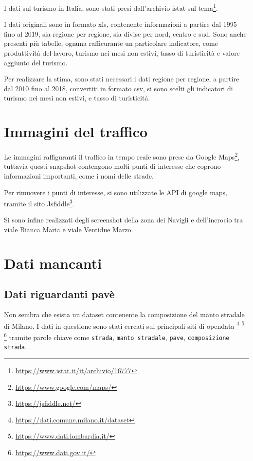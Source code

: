 \documentclass[a4paper]{report}
\newcommand{\columnstyle}[1]{\texttt{#1}}
\begin{document}
I dati sul turismo in Italia, sono stati presi dall'archivio istat sul 
tema\footnote{\url{https://www.istat.it/it/archivio/16777}}.

I dati originali sono in formato xls, contenente informazioni a partire dal 1995 fino al 2019, 
sia regione per regione, sia divise per nord, centro e sud.
Sono anche presenti più tabelle, ognuna rafficurante un particolare indicatore, 
come produttività del lavoro, turismo nei mesi non estivi, tasso di turisticità 
e valore aggiunto del turismo.

Per realizzare la stima, sono stati necessari i dati regione per regione, 
a partire dal 2010 fino al 2018, convertiti in formato csv, si sono scelti gli indicatori di 
turismo nei mesi non estivi, e tasso di turisticità. 

\section{Immagini del traffico}

Le immagini raffiguranti il traffico in tempo reale sono prese da Google 
Maps\footnote{\url{https://www.google.com/maps/}}, 
tuttavia questi snapshot contengono molti punti di interesse che coprono informazioni importanti, 
come i nomi delle strade.

Per rimuovere i punti di interesse, si sono utilizzate le API di google maps, 
tramite il sito Jsfiddle\footnote{\url{https://jsfiddle.net/}}.

Si sono infine realizzati degli screenshot della zona dei Navigli e dell'incrocio tra viale 
Bianca Maria e viale Ventidue Marzo.

\section{Dati mancanti}

\subsection{Dati riguardanti pavè}
Non sembra che esista un dataset contenente la composizione del manto stradale di Milano.
I dati in questione sono stati cercati sui principali siti di opendata
\footnote{\url{https://dati.comune.milano.it/dataset}}
\footnote{\url{https://www.dati.lombardia.it/}}
\footnote{\url{https://www.dati.gov.it/}}
tramite parole chiave come \columnstyle{strada}, \columnstyle{manto stradale}, 
\columnstyle{pave}, \columnstyle{composizione strada}.
\end{document}

